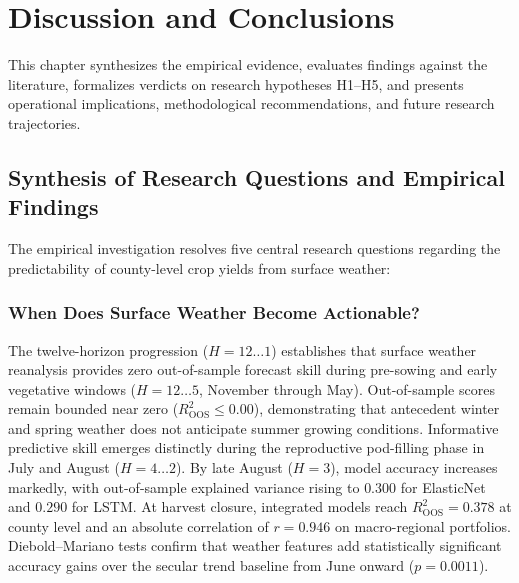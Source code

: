 \chapter{Discussion and Conclusions}
\label{chap:discussion_conclusions}

This chapter synthesizes the empirical evidence, evaluates findings against the literature, formalizes verdicts on research hypotheses H1--H5, and presents operational implications, methodological recommendations, and future research trajectories.


\section{Synthesis of Research Questions and Empirical Findings}
\label{sec:disc_synthesis}

The empirical investigation resolves five central research questions regarding the predictability of county-level crop yields from surface weather:

\subsection{When Does Surface Weather Become Actionable?}
The twelve-horizon progression ($H=12 \dots 1$) establishes that surface weather reanalysis provides zero out-of-sample forecast skill during pre-sowing and early vegetative windows ($H=12 \dots 5$, November through May). Out-of-sample scores remain bounded near zero ($R^2_{\text{OOS}} \le 0.00$), demonstrating that antecedent winter and spring weather does not anticipate summer growing conditions. Informative predictive skill emerges distinctly during the reproductive pod-filling phase in July and August ($H=4 \dots 2$). By late August ($H=3$), model accuracy increases markedly, with out-of-sample explained variance rising to $0.300$ for ElasticNet and $0.290$ for LSTM. At harvest closure, integrated models reach $R^2_{\text{OOS}} = 0.378$ at county level and an absolute correlation of $r = 0.946$ on macro-regional portfolios. Diebold--Mariano tests confirm that weather features add statistically significant accuracy gains over the secular trend baseline from June onward ($p = 0.0011$).

